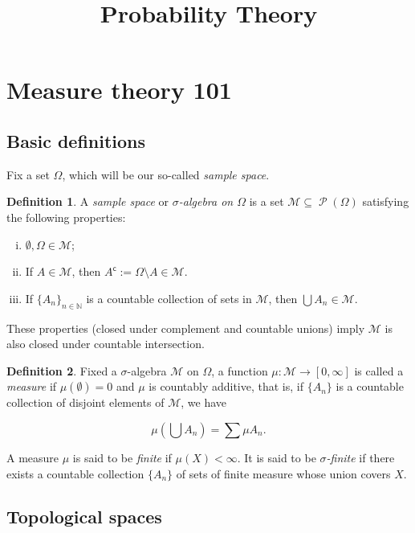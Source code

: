 \documentclass{article}
\title{Probability Theory}
\author{}
\date{}
\theoremstyle{definition}
\newtheorem{definition}{Definition}
\newcommand{\M}{\mathcal{M}}
\DeclareMathOperator{\PP}{\mathcal{P}}
\newcommand{\N}{\mathbb{N}}
\newcommand{\cc}{\mathsf{c}}
\begin{document}
	\maketitle
	
	\section{Measure theory 101}
	
	\subsection{Basic definitions}
	
	Fix a set $\Omega$, which will be our so-called \emph{sample space}.
	
	\begin{definition}
	A \emph{sample space} or \emph{$\sigma$-algebra on $\Omega$} is a set $\M \subseteq \PP(\Omega)$ satisfying the following properties:
	
	\begin{enumerate}[i)]
	\item $\emptyset, \Omega \in \M$;
	
	\item If $A \in \M$, then $A^\cc := \Omega \setminus A \in \M$.
	
	\item If $\{A_n\}_{n \in \N}$ is a countable collection of sets in $\M$, then $\bigcup A_n \in \M$.
	\end{enumerate}
	\end{definition}
	
	These properties (closed under complement and countable unions) imply $\M$ is also closed under countable intersection.
	
	\begin{definition}
	Fixed a $\sigma$-algebra $\M$ on $\Omega$, a function $\mu : \M \to \left[0, \infty \right]$ is called a \emph{measure} if $\mu(\emptyset) = 0$ and $\mu$ is countably additive, that is, if $\{A_n\}$ is a countable collection of disjoint elements of $\M$, we have
	
	\[\mu(\bigcup A_n) = \sum \mu A_n.\]
	\end{definition}
	
	A measure $\mu$ is said to be \emph{finite} if $\mu(X) < \infty$. It is said to be \emph{$\sigma$-finite} if there exists a countable collection $\{A_n\}$ of sets of finite measure whose union covers $X$.
	
	\subsection{Topological spaces}
	
\end{document}
